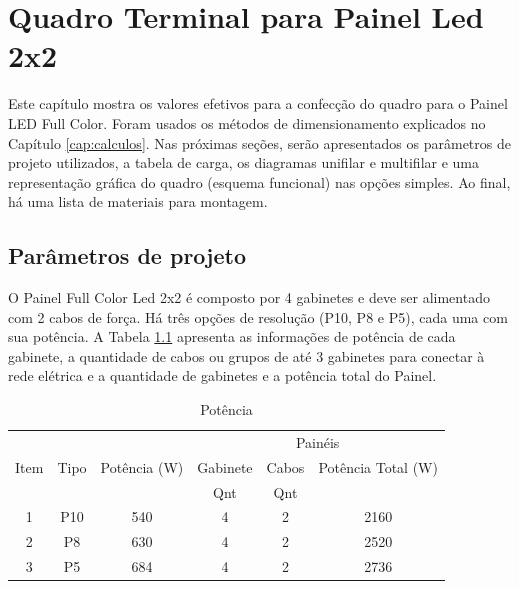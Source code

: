 \chapter{Quadro Terminal para Painel Led 2x2}

Este capítulo mostra os valores efetivos para a confecção do quadro para o Painel LED Full Color. Foram usados os métodos de dimensionamento explicados no Capítulo \ref{cap:calculos}. Nas próximas seções, serão apresentados os parâmetros de projeto utilizados, a tabela de carga, os diagramas unifilar e multifilar e uma representação gráfica do quadro (esquema funcional) nas opções simples. Ao final, há uma lista de materiais para montagem.

\section{Parâmetros de projeto}

O Painel Full Color Led 2x2 é composto por 4 gabinetes e deve ser alimentado com 2 cabos de força. Há três opções de resolução (P10, P8 e P5), cada uma com sua potência. A Tabela \ref{tab:pot_2x2} apresenta as informações de potência de cada gabinete, a quantidade de cabos ou grupos de até 3 gabinetes para conectar à rede elétrica e a quantidade de gabinetes e a potência total do Painel.

\begin{table}[htbp]
\caption{Potência}
\centering
\begin{tabular}{cccccc}
\toprule
\multirow{3}{*}{Item} & \multirow{3}{*}{Tipo} & \multirow{3}{*}{Potência (W)} & \multicolumn{3}{c}{Painéis} \\
\cmidrule{4-6}
                      &                        &                               & Gabinete & Cabos  & Potência Total (W) \\
                      &                        &                               & Qnt      & Qnt    &                    \\
\midrule
1                     & P10                    & 540                           & 4        & 2      & 2160               \\
2                     & P8                     & 630                           & 4        & 2      & 2520               \\
3                     & P5                     & 684                           & 4        & 2      & 2736               \\
\bottomrule
\end{tabular}
\label{tab:pot_2x2}
\end{table}


